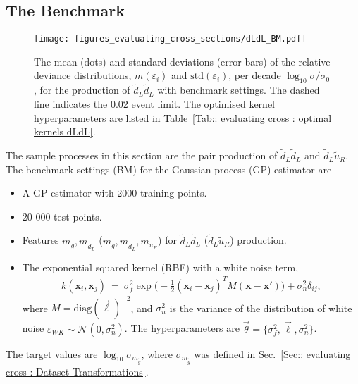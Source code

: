 \documentclass[twoside,english]{uiofysmaster}
\begin{document}
{{\subsection{The Benchmark}\label{Sec:: evaluating cross : The Benchmark}

\begin{figure}
\centering
\texttt{[image: figures\_evaluating\_cross\_sections/dLdL\_BM.pdf]}
\caption[Relative deviance distributions for the benchmark GP estimator]{The mean (dots) and standard deviations (error bars) of the relative deviance distributions, $m(\varepsilon_i)$ and $\mathrm{std}(\varepsilon_i)$, per decade $\log_{10} \sigma / \sigma_0$, for the production of $\widetilde{d}_L \widetilde{d}_L$ with benchmark settings. The dashed line indicates the 0.02 event limit.  The optimised kernel hyperparameters are listed in Table~\ref{Tab:: evaluating cross : optimal kernels dLdL}.}
\label{Fig:: evaluating cross : BM dLdL error plot}
\end{figure}

The sample processes in this section are the pair production of $\widetilde{d}_L \widetilde{d}_L$ and $\widetilde{d}_L \widetilde{u}_R$. The benchmark settings (BM) for the Gaussian process (GP) estimator are 
\begin{itemize}
\item A GP estimator with 2000 training points.
\item 20 000 test points.
\item Features $m_{\widetilde{g}}, m_{\widetilde{d}_L}$ ($m_{\widetilde{g}}, m_{\widetilde{d}_L}, m_{\widetilde{u}_R}$) for $\widetilde{d}_L \widetilde{d}_L$ ($\widetilde{d}_L \widetilde{u}_R$) production.
\item The exponential squared kernel (RBF) with a white noise term, 
\begin{align}\label{Eq:: results : Optimal DGPs kernel}
k(\textbf{x}_i, \textbf{x}_j)~=~\sigma_f^2 \exp \big(-\frac{1}{2} (\textbf{x}_i-\textbf{x}_j)^TM(\textbf{x} - \textbf{x}') \big) + \sigma_n^2 \delta_{ij},
\end{align}
where $M = \textrm{diag}(\vec{\ell})^{-2}$, and $\sigma_n^2$ is the variance of the distribution of white noise $\varepsilon_{WK} \sim \mathcal{N}(0, \sigma_n^2)$. The hyperparameters are $\vec{\theta} = \{ \sigma^2_f, \vec{\ell}, \sigma_n^2\}$.
\end{itemize} 
 The target values are $\log_{10} \sigma_{m_{\widetilde{g}}}$, where $\sigma_{m_{\widetilde{g}}}$ was defined in Sec.~\ref{Sec:: evaluating cross : Dataset Transformations}.
 
}}
\end{document}

